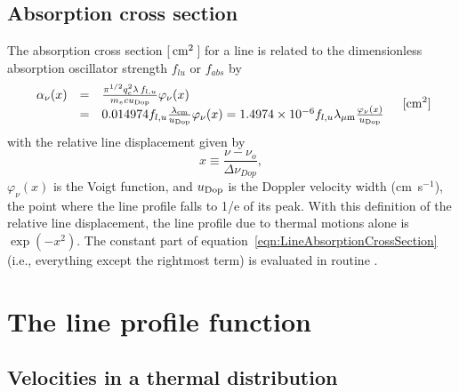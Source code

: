 \subsection{Absorption cross section}

The absorption cross section [$\mbox{${\rm\thinspace cm}^{2}\,$}$] for a line is related to the
dimensionless absorption oscillator strength $f_{lu}$ or $f_{abs}$ by
\begin{equation}
\label{eqn:LineAbsorptionCrossSection}
\begin{array}{ccl}
 {\alpha _\nu(x) }& =& \frac{{{\pi ^{1/2}}q_e^2\lambda
\,{f_{l,u}}}}{{{m_e}c{u_{\rm Dop}}}}{\varphi _\nu }(x) \\
& =& 0.014974{f_{l,u}}\frac{{{\lambda_{\rm cm}}}}{{{u_{\rm Dop}}}}{\varphi _\nu
}(x) = 1.4974 \times {10^{ - 6}}{f_{l,u}}\lambda_{\mu\rm m}\frac{\varphi_\nu(x)}{u_{\rm Dop}} \\
 \end{array}
\quad [\mathrm{cm}^2]
\end{equation}
with the relative line displacement given by
\begin{equation}
\label{eqn:RelativelineDisplacement}
x \equiv \frac{{\nu  - {\nu _o}}}{{\Delta {\nu _{Dop}}}} ,
\end{equation}
${\varphi _\nu }\left( x \right)$
is the Voigt function, and $u_{\rm Dop}$ is the Doppler velocity width
(cm~s$^{-1}$), the
point where the line profile falls to 1/e of its peak.
With this definition
of the relative line displacement, the line profile due to thermal motions
alone is $\exp(-x^2)$.
The constant part of equation~\ref{eqn:LineAbsorptionCrossSection}
(i.e., everything except the rightmost term) is evaluated
in routine .

\section{The line profile function}

\subsection{Velocities in a thermal distribution}

